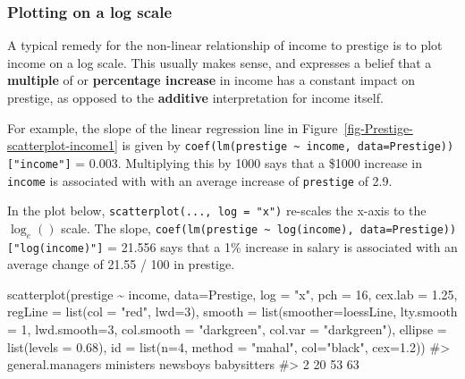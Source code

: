 \documentclass[
  letterpaper,
  10pt,
  krantz2]{krantz}
\makeatletter
\newenvironment{Shaded}{\begin{snugshade}}{\end{snugshade}}
\newcommand{\AttributeTok}[1]{\textcolor[rgb]{0.40,0.45,0.13}{#1}}
\newcommand{\CommentTok}[1]{\textcolor[rgb]{0.37,0.37,0.37}{#1}}
\newcommand{\DecValTok}[1]{\textcolor[rgb]{0.68,0.00,0.00}{#1}}
\newcommand{\FloatTok}[1]{\textcolor[rgb]{0.68,0.00,0.00}{#1}}
\newcommand{\FunctionTok}[1]{\textcolor[rgb]{0.28,0.35,0.67}{#1}}
\newcommand{\NormalTok}[1]{\textcolor[rgb]{0.00,0.23,0.31}{#1}}
\newcommand{\SpecialCharTok}[1]{\textcolor[rgb]{0.37,0.37,0.37}{#1}}
\newcommand{\StringTok}[1]{\textcolor[rgb]{0.13,0.47,0.30}{#1}}
\newenvironment{kframe}{%
  \medskip{}
  \setlength{\fboxsep}{.8em}
  \def\at@end@of@kframe{}%
  \ifinner\ifhmode%
  \def\at@end@of@kframe{\end{minipage}}%
  \begin{minipage}{\columnwidth}%
  \fi\fi%
  \def\FrameCommand##1{\hskip\@totalleftmargin \hskip-\fboxsep
  \colorbox{shadecolor}{##1}\hskip-\fboxsep
      \hskip-\linewidth \hskip-\@totalleftmargin \hskip\columnwidth}%
  \MakeFramed {\advance\hsize-\width
    \@totalleftmargin\z@ \linewidth\hsize
    \@setminipage}}%
{\par\unskip\endMakeFramed%
  \at@end@of@kframe}
\renewenvironment{Shaded}{\begin{kframe}}{\end{kframe}}
\makeatother
\begin{document}
\subsubsection{Plotting on a log scale}\label{sec-log-scale}

A typical remedy for the non-linear relationship of income to prestige
is to plot income on a log scale. This usually makes sense, and
expresses a belief that a \textbf{multiple} of or \textbf{percentage
increase} in income has a constant impact on prestige, as opposed to the
\textbf{additive} interpretation for income itself.

For example, the slope of the linear regression line in
Figure~\ref{fig-Prestige-scatterplot-income1} is given by
\texttt{coef(lm(prestige\ \textasciitilde{}\ income,\ data=Prestige)){[}"income"{]}}
= 0.003. Multiplying this by 1000 says that a \$1000 increase in
\texttt{income} is associated with with an average increase of
\texttt{prestige} of 2.9.

In the plot below, \texttt{scatterplot(...,\ log\ =\ "x")} re-scales the
x-axis to the \(\log_e()\) scale. The slope,
\texttt{coef(lm(prestige\ \textasciitilde{}\ log(income),\ data=Prestige)){[}"log(income)"{]}}
= 21.556 says that a 1\% increase in salary is associated with an
average change of 21.55 / 100 in prestige.

\begin{Shaded}
\begin{Highlighting}[]
\FunctionTok{scatterplot}\NormalTok{(prestige }\SpecialCharTok{\textasciitilde{}}\NormalTok{ income, }\AttributeTok{data=}\NormalTok{Prestige,}
  \AttributeTok{log =} \StringTok{"x"}\NormalTok{,}
  \AttributeTok{pch =} \DecValTok{16}\NormalTok{, }\AttributeTok{cex.lab =} \FloatTok{1.25}\NormalTok{,}
  \AttributeTok{regLine =} \FunctionTok{list}\NormalTok{(}\AttributeTok{col =} \StringTok{"red"}\NormalTok{, }\AttributeTok{lwd=}\DecValTok{3}\NormalTok{),}
  \AttributeTok{smooth =} \FunctionTok{list}\NormalTok{(}\AttributeTok{smoother=}\NormalTok{loessLine,}
                \AttributeTok{lty.smooth =} \DecValTok{1}\NormalTok{, }\AttributeTok{lwd.smooth=}\DecValTok{3}\NormalTok{,}
                \AttributeTok{col.smooth =} \StringTok{"darkgreen"}\NormalTok{, }\AttributeTok{col.var =} \StringTok{"darkgreen"}\NormalTok{),}
  \AttributeTok{ellipse =} \FunctionTok{list}\NormalTok{(}\AttributeTok{levels =} \FloatTok{0.68}\NormalTok{),}
  \AttributeTok{id =} \FunctionTok{list}\NormalTok{(}\AttributeTok{n=}\DecValTok{4}\NormalTok{, }\AttributeTok{method =} \StringTok{"mahal"}\NormalTok{, }\AttributeTok{col=}\StringTok{"black"}\NormalTok{, }\AttributeTok{cex=}\FloatTok{1.2}\NormalTok{))}
\CommentTok{\#\textgreater{} general.managers        ministers         newsboys      babysitters }
\CommentTok{\#\textgreater{}                2               20               53               63}
\end{Highlighting}
\end{Shaded}
\end{document}
